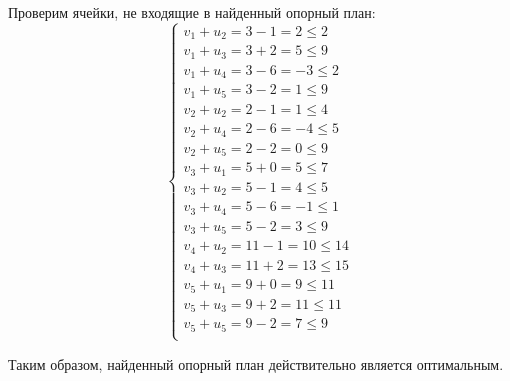 \documentclass[../body.tex]{subfiles}
\begin{document}
Проверим ячейки, не входящие в найденный опорный план:
\begin{equation}
    \left\{
    \begin{array}{ll}
        v_1 + u_2 = 3 - 1 = 2 \leq 2\\
        v_1 + u_3 = 3 + 2 = 5 \leq 9\\
        v_1 + u_4 = 3 - 6 = -3 \leq 2\\
        v_1 + u_5 = 3 - 2 = 1 \leq 9\\
        v_2 + u_2 = 2 - 1 = 1 \leq 4\\
        v_2 + u_4 = 2 - 6 = -4 \leq 5\\
        v_2 + u_5 = 2 - 2 = 0 \leq 9\\
        v_3 + u_1 = 5 + 0 = 5 \leq 7\\
        v_3 + u_2 = 5 - 1 = 4 \leq 5\\
        v_3 + u_4 = 5 - 6 = -1 \leq 1\\
        v_3 + u_5 = 5 - 2 = 3 \leq 9\\
        v_4 + u_2 = 11 - 1 = 10 \leq 14\\
        v_4 + u_3 = 11 + 2 = 13 \leq 15\\
        v_5 + u_1 = 9 + 0 = 9 \leq 11\\
        v_5 + u_3 = 9 + 2 = 11 \leq 11\\
        v_5 + u_5 = 9 - 2 = 7 \leq 9\\
    \end{array}
    \right.
\end{equation}

Таким образом, найденный опорный план действительно является оптимальным.
\end{document}
